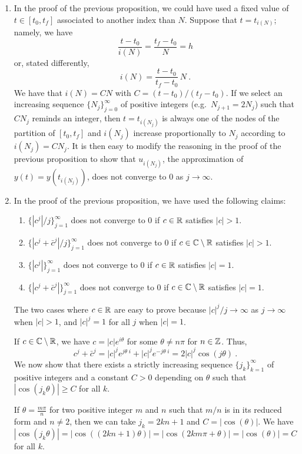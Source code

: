 \begin{rmkList}
\begin{enumerate}
\item In the proof of the previous proposition, we could have used a
fixed value of $t \in [t_0,t_f]$ associated to another index than $N$.
Suppose that $t = t_{i(N)}$; namely, we have
\[
  \frac{t-t_0}{i(N)} = \frac{t_f-t_0}{N} = h
\]
or, stated differently,
\[
  i(N) = \frac{t-t_0}{t_f-t_0}\, N \ .
\]
We have that $i(N) = C N$ with $C = (t-t_0)/(t_f-t_0)$.
If we select an increasing sequence $\{N_j\}_{j=0}^\infty$ of positive
integers (e.g.\ $N_{j+1} = 2 N_j$) such that $C N_j$ reminds an
integer, then $t = t_{i(N_j)}$ is always one of the nodes of the
partition of $[t_0,t_f]$ and $i(N_j)$ increase proportionally to $N_j$
according to $i(N_j) = C N_j$.  It is then easy to modify the
reasoning in the proof of the previous proposition to show that
$u_{i(N_j)}$, the approximation of $y(t) = y(t_{i(N_j)})$, does not
converge to $0$ as $j \to \infty$.
\item In the proof of the previous proposition, we have used the
following claims:
\begin{enumerate}  
\item $\{|c^j|/j\}_{j=1}^\infty$ does not converge to $0$ if
$c\in \mathbb{R}$ satisfies $|c|>1$.
\item $\{|c^j+\bar{c}^j|/j\}_{j=1}^\infty$ does not converge to $0$ if
$c\in \mathbb{C} \setminus \mathbb{R}$ satisfies $|c|>1$.
\item $\{|c^j|\}_{j=1}^\infty$ does not converge to $0$ if $c\in \mathbb{R}$
satisfies $|c| = 1$.
\item $\{|c^j+\bar{c}^j|\}_{j=1}^\infty$ does not converge to $0$ if
$c\in \mathbb{C} \setminus \mathbb{R}$ satisfies $|c|=1$.
\end{enumerate}

The two cases where $c \in \mathbb{R}$ are easy to prove because
$ |c|^j/j \to \infty$ as $j \to \infty$ when $|c| >1$, and
$|c|^j = 1$ for all $j$ when $|c|=1$.

If $c \in \mathbb{C} \setminus \mathbb{R}$, we have $c = |c| e^{i\theta}$ for some
$\theta \neq n\pi$ for $n \in \mathbb{Z}$.  Thus,
\[
 c^j+\bar{c}^j = |c|^j e^{j \theta\;i} + |c|^j e^{-j \theta\;i}
 = 2|c|^j \cos(j \theta) \ .
\]
We now show that there exists a strictly increasing sequence
$\{j_k\}_{k=1}^\infty$ of positive integers and a constant $C>0$
depending on $\theta$ such that $|\cos(j_k \theta)|\geq C$ for all $k$.

If $\displaystyle \theta = \frac{m \pi}{n}$ for two positive integer
$m$ and $n$ such that $m/n$ is in its reduced form and $n\neq 2$, then
we can take $j_k = 2 k n +1$ and $C = |\cos(\theta)|$.  We have
\[
  |\cos(j_k \theta)| = |\cos( (2kn+1) \theta)|
  = |\cos( 2km\pi + \theta)| = |\cos(\theta)| = C
\]
for all $k$.


\end{enumerate}
\end{rmkList}
